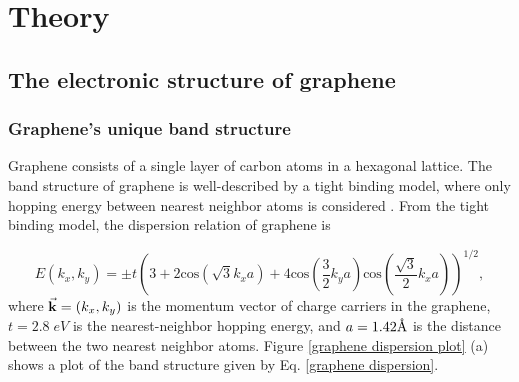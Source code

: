 \documentclass[double,12pt,1in]{beavtex}
\begin{document}
\chapter{Theory}

\section{The electronic structure of graphene}

\subsection{Graphene's unique band structure}

Graphene consists of a single layer of carbon atoms in a hexagonal lattice. The band structure of graphene is well-described by a tight binding model, where only hopping energy between nearest neighbor atoms is considered \cite{wallace_band_1947}. From the tight binding model, the dispersion relation of graphene is 

\begin{equation}
    E(k_x, k_y) = \pm t  \left(3 + 2\mathrm{cos}(\sqrt{3}k_x a) + 4\mathrm{cos}(\frac{3}{2}k_y a)\mathrm{cos}(\frac{\sqrt{3}}{2}k_x a)\right)^{1/2}, \label{graphene dispersion}
\end{equation}
where $\vectorarrow{k} = (k_x, k_y)$ is the momentum vector of charge carriers in the graphene, $t = 2.8 \; eV$ is the nearest-neighbor hopping energy, and $a = 1.42 \SIUnitSymbolAngstrom$ is the distance between the two nearest neighbor atoms. Figure \ref{graphene dispersion plot} (a) shows a plot of the band structure given by Eq. \ref{graphene dispersion}.
\end{document}
